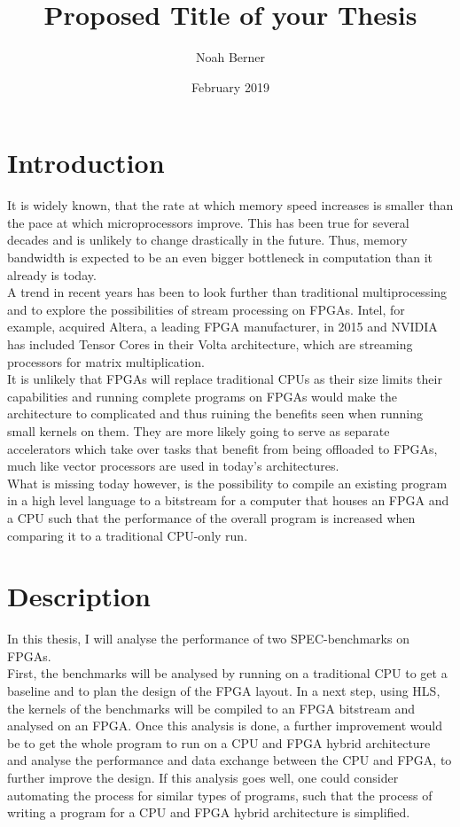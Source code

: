 \documentclass[12pt]{article}
\title{Proposed Title of your Thesis}
\author{Noah Berner}
\date{February 2019}
\begin{document}

\section*{Introduction}
It is widely known, that the rate at which memory speed increases is smaller than the pace at which microprocessors improve. This has been true for several decades and is unlikely to change drastically in the future. Thus, memory bandwidth is expected to be an even bigger bottleneck in computation than it already is today.\\
A trend in recent years has been to look further than traditional multiprocessing and to explore the possibilities of stream processing on FPGAs. Intel, for example, acquired Altera, a leading FPGA manufacturer, in 2015 and NVIDIA has included Tensor Cores in their Volta architecture, which are streaming processors for matrix multiplication.\\
It is unlikely that FPGAs will replace traditional CPUs as their size limits their capabilities and running complete programs on FPGAs would make the architecture to complicated and thus ruining the benefits seen when running small kernels on them. They are more likely going to serve as separate accelerators which take over tasks that benefit from being offloaded to FPGAs, much like vector processors are used in today's architectures.\\
What is missing today however, is the possibility to compile an existing program in a high level language to a bitstream for a computer that houses an FPGA and a CPU such that the performance of the overall program is increased when comparing it to a traditional CPU-only run.
\section*{Description}
In this thesis, I will analyse the performance of two SPEC-benchmarks on FPGAs.\\
First, the benchmarks will be analysed by running on a traditional CPU to get a baseline and to plan the design of the FPGA layout. In a next step, using HLS, the kernels of the benchmarks will be compiled to an FPGA bitstream and analysed on an FPGA. Once this analysis is done, a further improvement would be to get the whole program to run on a CPU and FPGA hybrid architecture and analyse the performance and data exchange between the CPU and FPGA, to further improve the design. If this analysis goes well, one could consider automating the process for similar types of programs, such that the process of writing a program for a CPU and FPGA hybrid architecture is simplified.
\end{document}

